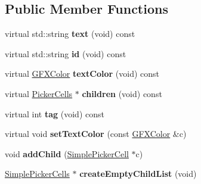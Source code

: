 \subsection*{Public Member Functions}
\begin{DoxyCompactItemize}
\item 
virtual std\+::string {\bfseries text} (void) const \hypertarget{classSimplePickerCell_a723da2db7f72a280d48ec1f114e3a8fd}{}\label{classSimplePickerCell_a723da2db7f72a280d48ec1f114e3a8fd}

\item 
virtual std\+::string {\bfseries id} (void) const \hypertarget{classSimplePickerCell_abfdfba2a99b12c34f7b6eaf1588cef9a}{}\label{classSimplePickerCell_abfdfba2a99b12c34f7b6eaf1588cef9a}

\item 
virtual \hyperlink{structGFXColor}{G\+F\+X\+Color} {\bfseries text\+Color} (void) const \hypertarget{classSimplePickerCell_a1e953c3a0e522126742e49262949e1b8}{}\label{classSimplePickerCell_a1e953c3a0e522126742e49262949e1b8}

\item 
virtual \hyperlink{classPickerCells}{Picker\+Cells} $\ast$ {\bfseries children} (void) const \hypertarget{classSimplePickerCell_aa1d81a1538b6ca26b4e702d4ed7f5da9}{}\label{classSimplePickerCell_aa1d81a1538b6ca26b4e702d4ed7f5da9}

\item 
virtual int {\bfseries tag} (void) const \hypertarget{classSimplePickerCell_a747009fb3c7530a7df39f2e23bbd9813}{}\label{classSimplePickerCell_a747009fb3c7530a7df39f2e23bbd9813}

\item 
virtual void {\bfseries set\+Text\+Color} (const \hyperlink{structGFXColor}{G\+F\+X\+Color} \&c)\hypertarget{classSimplePickerCell_af3866978fff9d42f9c61a8169b1787e6}{}\label{classSimplePickerCell_af3866978fff9d42f9c61a8169b1787e6}

\item 
void {\bfseries add\+Child} (\hyperlink{classSimplePickerCell}{Simple\+Picker\+Cell} $\ast$c)\hypertarget{classSimplePickerCell_a1b9e5d6aba9b3f931a364085690979cc}{}\label{classSimplePickerCell_a1b9e5d6aba9b3f931a364085690979cc}

\item 
\hyperlink{classSimplePickerCells}{Simple\+Picker\+Cells} $\ast$ {\bfseries create\+Empty\+Child\+List} (void)\hypertarget{classSimplePickerCell_aa32b8d21df135087aba7558b42a10ac9}{}\label{classSimplePickerCell_aa32b8d21df135087aba7558b42a10ac9}


\end{DoxyCompactItemize}
